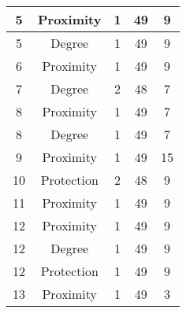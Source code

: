 \documentclass[results.tex]{subfiles}
\begin{document}
\begin{center}
\begin{tabular}{| c || c | c | c | c |}
            \hline
            5                       & Proximity                    & 1                      & 49                      & 9                    \\
            \hline
            5                       & Degree                       & 1                      & 49                      & 9                    \\
            \hline
            6                       & Proximity                    & 1                      & 49                      & 9                    \\
            \hline
            7                       & Degree                       & 2                      & 48                      & 7                    \\
            \hline
            8                       & Proximity                    & 1                      & 49                      & 7                    \\
            \hline
            8                       & Degree                       & 1                      & 49                      & 7                    \\
            \hline
            9                       & Proximity                    & 1                      & 49                      & 15                   \\
            \hline
            10                      & Protection                   & 2                      & 48                      & 9                    \\
            \hline
            11                      & Proximity                    & 1                      & 49                      & 9                    \\
            \hline
            12                      & Proximity                    & 1                      & 49                      & 9                    \\
            \hline
            12                      & Degree                       & 1                      & 49                      & 9                    \\
            \hline
            12                      & Protection                   & 1                      & 49                      & 9                    \\
            \hline
            13                      & Proximity                    & 1                      & 49                      & 3                    \\

\end{tabular}
\end{center}
\end{document}
